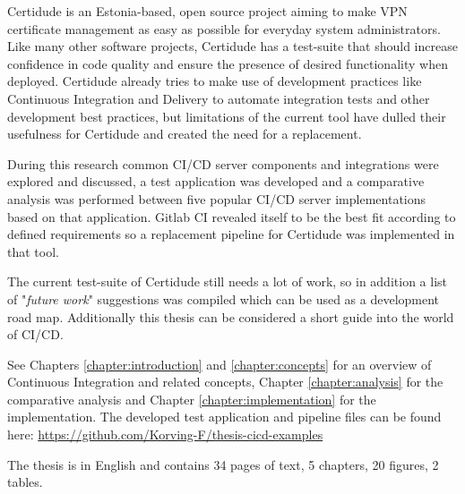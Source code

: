 Certidude is an Estonia-based, open source project aiming to make VPN certificate 
management as easy as possible for everyday system administrators. Like many other software projects,
Certidude has a test-suite that should increase confidence in code quality and ensure the presence of desired
functionality when deployed. Certidude already tries to make use of development practices like 
Continuous Integration and Delivery to automate integration tests and other development best practices, 
but limitations of the current tool have dulled their usefulness for Certidude and created the need 
for a replacement.

During this research common CI/CD server components and integrations were explored and discussed,
a test application was developed and
a comparative analysis was performed between five popular CI/CD server implementations based on that
application. Gitlab CI revealed itself to be the best fit according to defined requirements so a replacement
pipeline for Certidude was implemented in that tool. 

The current test-suite of Certidude still needs a lot of work, so in addition a list of "\textit{future work}"
suggestions was compiled which can be used as a development road map. Additionally this thesis can be considered
a short guide into the world of CI/CD. 

See Chapters \ref{chapter:introduction} and \ref{chapter:concepts} for an overview of Continuous Integration and related concepts, Chapter \ref{chapter:analysis} for the comparative analysis and Chapter \ref{chapter:implementation} for the implementation. The developed test application and pipeline files can be found here: \url{https://github.com/Korving-F/thesis-cicd-examples}

The thesis is in English and contains 34 pages of text, 5 chapters, 20 figures, 2 tables.